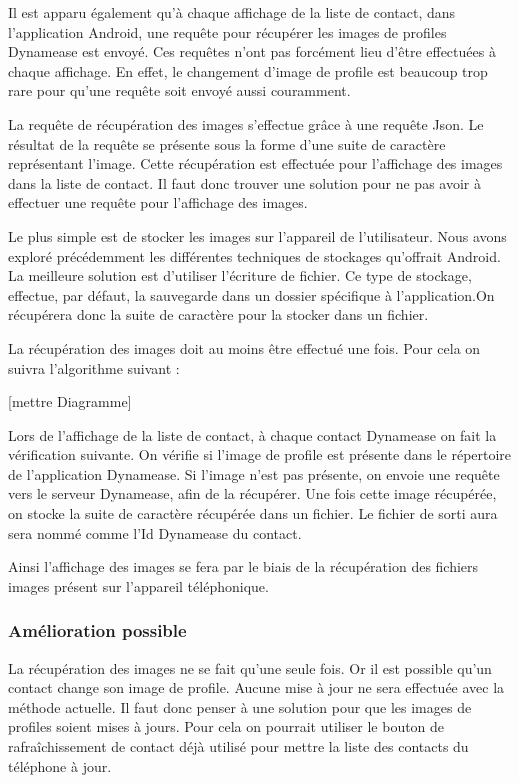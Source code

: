 Il est apparu également qu'à chaque affichage de la liste de contact, dans l'application Android, une requête pour récupérer les images de profiles Dynamease est envoyé. Ces requêtes n'ont pas forcément lieu d'être effectuées à chaque affichage. En effet, le changement d'image de profile est beaucoup trop rare pour qu'une requête soit envoyé aussi couramment.

La requête de récupération des images s'effectue grâce à une requête Json. Le résultat de la requête se présente sous la forme d'une suite de caractère représentant l'image. Cette récupération est effectuée pour l'affichage des images dans la liste de contact. Il faut donc trouver une solution pour ne pas avoir à effectuer une requête pour l'affichage des images.

Le plus simple est de stocker les images sur l'appareil de l'utilisateur. Nous avons exploré précédemment les différentes techniques de stockages qu'offrait Android. La meilleure solution est d'utiliser l'écriture de fichier. Ce type de stockage, effectue, par défaut, la sauvegarde dans un dossier spécifique à l'application.On récupérera donc la suite de caractère pour la stocker dans un fichier. 

La récupération des images doit au moins être effectué une fois. Pour cela on suivra l'algorithme suivant :

[mettre Diagramme]

Lors de l'affichage de la liste de contact, à chaque contact Dynamease on fait la vérification suivante. On vérifie si l'image de profile est présente dans le répertoire de l'application Dynamease. Si l'image n'est pas présente, on envoie une requête vers le serveur Dynamease, afin de la récupérer. Une fois cette image récupérée, on stocke la suite de caractère récupérée dans un fichier. Le fichier de sorti aura sera nommé comme l'Id Dynamease du contact.

Ainsi l'affichage des images se fera par le biais de la récupération des fichiers images présent sur l'appareil téléphonique.

\subsubsection{Amélioration possible}

La récupération des images ne se fait qu'une seule fois. Or il est possible qu'un contact change son image de profile. Aucune mise à jour ne sera effectuée avec la méthode actuelle. Il faut donc penser à une solution pour que les images de profiles soient mises à jours. Pour cela on pourrait utiliser le bouton de rafraîchissement de contact déjà utilisé pour mettre la liste des contacts du téléphone à jour. 


